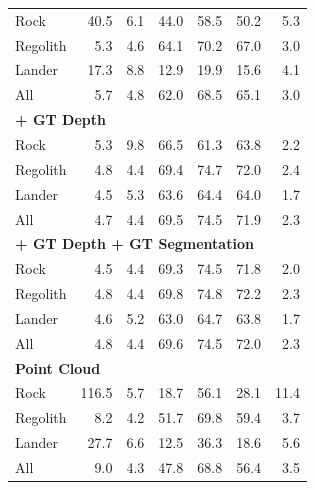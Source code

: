 \begin{table}[h]
\begin{tabular}[t]{|lrrrrrr|}
		Rock                                           & 40.5  & 6.1  & 44.0 & 58.5 & 50.2 & 5.3  \\
		Regolith                                       & 5.3   & 4.6  & 64.1 & 70.2 & 67.0 & 3.0  \\
		Lander                                         & 17.3  & 8.8  & 12.9 & 19.9 & 15.6 & 4.1  \\
		All                                            & 5.7   & 4.8  & 62.0 & 68.5 & 65.1 & 3.0  \\
		\hline
		\multicolumn{7}{|l|}{\textbf{+ GT Depth}}                                                 \\ \hline
		Rock                                           & 5.3   & 9.8  & 66.5 & 61.3 & 63.8 & 2.2  \\
		Regolith                                       & 4.8   & 4.4  & 69.4 & 74.7 & 72.0 & 2.4  \\
		Lander                                         & 4.5   & 5.3  & 63.6 & 64.4 & 64.0 & 1.7  \\
		All                                            & 4.7   & 4.4  & 69.5 & 74.5 & 71.9 & 2.3  \\
		\hline
		\multicolumn{7}{|l|}{\textbf{+ GT Depth + GT Segmentation}}                               \\ \hline
		Rock                                           & 4.5   & 4.4  & 69.3 & 74.5 & 71.8 & 2.0  \\
		Regolith                                       & 4.8   & 4.4  & 69.8 & 74.8 & 72.2 & 2.3  \\
		Lander                                         & 4.6   & 5.2  & 63.0 & 64.7 & 63.8 & 1.7  \\
		All                                            & 4.8   & 4.4  & 69.6 & 74.5 & 72.0 & 2.3  \\
		\hline
		\multicolumn{7}{|l|}{\textbf{Point Cloud}}                                                \\ \hline
		Rock                                           & 116.5 & 5.7  & 18.7 & 56.1 & 28.1 & 11.4 \\
		Regolith                                       & 8.2   & 4.2  & 51.7 & 69.8 & 59.4 & 3.7  \\
		Lander                                         & 27.7  & 6.6  & 12.5 & 36.3 & 18.6 & 5.6  \\
		All                                            & 9.0   & 4.3  & 47.8 & 68.8 & 56.4 & 3.5  \\

\end{tabular}
\end{table}

